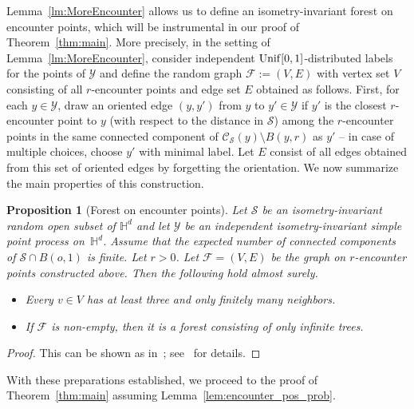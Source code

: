 \documentclass[12pt,a4paper]{article}
\newtheorem{proposition}{Proposition}[section]
\theoremstyle{definition}
\begin{document}
Lemma~\ref{lm:MoreEncounter} allows us to define an isometry-invariant forest on encounter points, which will be instrumental in our proof of Theorem~\ref{thm:main}. More precisely, in the setting of Lemma~\ref{lm:MoreEncounter}, consider independent ${\rm Unif}[0,1]$-distributed labels for the points of $\mathcal Y$ and define the random graph $\mathcal F:=(V,E)$ with vertex set $V$ consisting of all $r$-encounter points and edge set $E$ obtained as follows. First, for each $y\in \mathcal Y$, draw an oriented edge $(y,y')$ from $y$ to $y'\in \mathcal Y$ if $y'$ is the closest $r$-encounter point to $y$ (with respect to the distance in $\mathcal S$) among the $r$-encounter points in the same connected component of $\mathcal C_{\mathcal S}(y)\setminus B(y,r)$ as $y'$ -- in case of multiple choices, choose $y'$ with minimal label. Let $E$ consist of all edges obtained from this set of oriented edges by forgetting the orientation. We now summarize the main properties of this construction.


\begin{proposition}[Forest on encounter points]\label{prop:ForestEncounter}
Let $\mathcal S$ be an isometry-invariant random open subset of $\mathbb H^d$ and let $\mathcal Y$ be an independent isometry-invariant simple point process on~$\mathbb H^d$. Assume that the expected number of connected components of $\mathcal S \cap B(o,1)$ is finite. Let $r>0$. Let $\mathcal F=(V,E)$ be the graph on $r$-encounter points constructed above. Then the following hold almost surely.
\begin{itemize}
\item[{\rm(i)}] Every $v\in V$ has at least three and only finitely many neighbors.
\item[{\rm(ii)}] If $\mathcal F$ is non-empty, then it is a forest consisting of only infinite trees.
\end{itemize}
\end{proposition}

\begin{proof} This can be shown as in~\cite[p.~1352]{BLPS99}; see~\cite[Lemma 4.3 \& Lemma 4.4]{MS25} for details.
\end{proof}

With these preparations established, we proceed to the proof of Theorem~\ref{thm:main} assuming Lemma~\ref{lem:encounter_pos_prob}.
\end{document}
